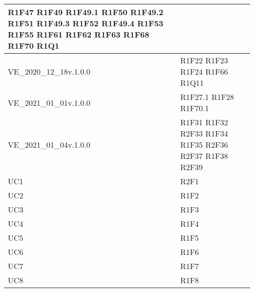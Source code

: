 \begin{center}
\begin{longtable}{|p{44mm}|p{22mm}|}
		R1F47 \newline
		R1F49 \newline
		R1F49.1 \newline
		R1F50 \newline
		R1F49.2 \newline
		R1F51 \newline
		R1F49.3 \newline
		R1F52 \newline
		R1F49.4 \newline
		R1F53 \newline
		R1F55 \newline
		R1F61 \newline
		R1F62 \newline
		R1F63 \newline
		R1F68 \newline
		R1F70 \newline
		R1Q1 
		\\
		\hline
		VE\_2020\_12\_18v.1.0.0 &
		R1F22 \newline
		R1F23 \newline
		R1F24 \newline
		R1F66 \newline
		R1Q11 
		\\
		\hline
		VE\_2021\_01\_01v.1.0.0 &
		R1F27.1 \newline
		R1F28 \newline
		R1F70.1 
		\\
		\hline
		VE\_2021\_01\_04v.1.0.0 &
		R1F31 \newline
		R1F32 \newline
		R2F33 \newline
		R1F34 \newline
		R1F35 \newline
		R2F36 \newline
		R2F37 \newline
		R1F38 \newline
		R2F39 
		\\
		\hline
		UC1 &
		R2F1 
		\\
		\hline
		UC2 &
		R1F2 
		\\
		\hline
		UC3 &
		R1F3 
		\\
		\hline
		UC4 &
		R1F4 
		\\
		\hline
		UC5 &
		R1F5 
		\\
		\hline
		UC6 &
		R1F6 
		\\
		\hline
		UC7 &
		R1F7 
		\\
		\hline
		UC8 &
		R1F8 
		\\

\end{longtable}
\end{center}
